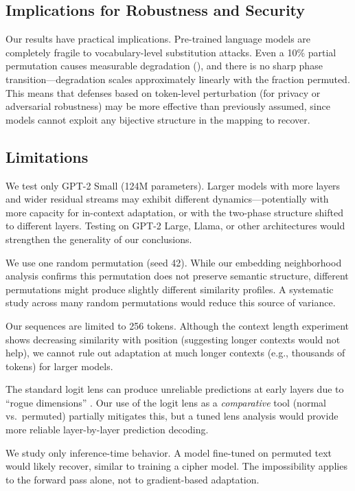 \subsection{Implications for Robustness and Security}

Our results have practical implications. Pre-trained language models are completely fragile to vocabulary-level substitution attacks. Even a 10\% partial permutation causes measurable degradation (), and there is no sharp phase transition---degradation scales approximately linearly with the fraction permuted. This means that defenses based on token-level perturbation (for privacy or adversarial robustness) may be more effective than previously assumed, since models cannot exploit any bijective structure in the mapping to recover.

\subsection{Limitations}
\label{sec:limitations}

 We test only GPT-2 Small (124M parameters). Larger models with more layers and wider residual streams may exhibit different dynamics---potentially with more capacity for in-context adaptation, or with the two-phase structure shifted to different layers. Testing on GPT-2 Large, Llama, or other architectures would strengthen the generality of our conclusions.

 We use one random permutation (seed 42). While our embedding neighborhood analysis confirms this permutation does not preserve semantic structure, different permutations might produce slightly different similarity profiles. A systematic study across many random permutations would reduce this source of variance.

 Our sequences are limited to 256 tokens. Although the context length experiment shows decreasing similarity with position (suggesting longer contexts would not help), we cannot rule out adaptation at much longer contexts (e.g., thousands of tokens) for larger models.

 The standard logit lens can produce unreliable predictions at early layers due to ``rogue dimensions'' \citep{belrose2023tuned}. Our use of the logit lens as a \emph{comparative} tool (normal vs.\ permuted) partially mitigates this, but a tuned lens analysis would provide more reliable layer-by-layer prediction decoding.

 We study only inference-time behavior. A model fine-tuned on permuted text would likely recover, similar to training a cipher model. The impossibility applies to the forward pass alone, not to gradient-based adaptation.
